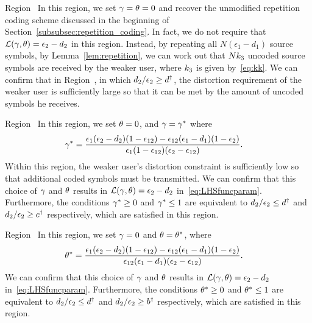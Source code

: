 \begin{LaTeXdescription}
	\item[Region~\Rmnum{5}] In this region, we set $\gamma = \theta = 0$ and recover the unmodified repetition coding scheme discussed in the beginning of Section~\ref{subsubsec:repetition_coding}.  In fact, we do not require that $\mathcal{L}(\gamma, \theta) = \epsilon_2 - d_2$ in this region.  Instead, by repeating all $N(\epsilon_1 - d_1)$ source symbols, by Lemma~\ref{lem:repetition}, we can work out that $Nk_3$ uncoded source symbols are received by the weaker user, where $k_3$ is given by~\eqref{eq:kk}.  We can confirm that in Region~, in which $d_2/\epsilon_2 \geq d^{\dagger}$, the distortion requirement of the weaker user is sufficiently large so that it can be met by the amount of uncoded symbols he receives.
	\item[Region~\Rmnum{4}] In this region, we set $\theta = 0$, and $\gamma = \gamma^{*}$ where 
		\begin{align}
			\gamma^{*} &= \frac{\epsilon_1(\epsilon_2 - d_2)(1 - \epsilon_{12}) - \epsilon_{12}(\epsilon_1 - d_1)(1 - \epsilon_2)}{\epsilon_1(1 - \epsilon_{12})(\epsilon_2 - \epsilon_{12})}.
			\label{eq:gammatilde}
		\end{align}
		Within this region, the weaker user's distortion constraint is sufficiently low so that additional coded symbols must be transmitted.  We can confirm that this choice of $\gamma$ and $\theta$ results in $\mathcal{L}(\gamma, \theta) = \epsilon_2 - d_2$ in~\eqref{eq:LHSfuncparam}.  Furthermore, the conditions $\gamma^{*} \geq 0$ and $\gamma^{*} \leq 1$ are equivalent to $d_2/\epsilon_2 \leq d^{\dagger}$ and $d_2/\epsilon_2 \geq c^{\dagger}$ respectively, which are satisfied in this region.
	\item [Region~\Rmnum{3}]  In this region, we set $\gamma = 0$ and $\theta = \theta^{*}$, where
		\begin{align}
			\theta^{*} &= \frac{\epsilon_1(\epsilon_2 - d_2)(1 - \epsilon_{12}) - \epsilon_{12}(\epsilon_1 - d_1)(1 - \epsilon_2)}{\epsilon_{12}(\epsilon_1 - d_1)(\epsilon_2 - \epsilon_{12})}.
		\end{align}
		We can confirm that this choice of $\gamma$ and $\theta$ results in $\mathcal{L}(\gamma, \theta) = \epsilon_2 - d_2$ in~\eqref{eq:LHSfuncparam}.  Furthermore, the conditions $\theta^{*} \geq 0$ and $\theta^{*} \leq 1$ are equivalent to $d_2/\epsilon_2 \leq d^{\dagger}$ and $d_2/\epsilon_2 \geq b^{\dagger}$ respectively, which are satisfied in this region.%
	

\end{LaTeXdescription}
